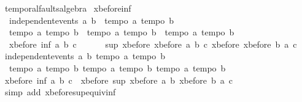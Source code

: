 \begin{isabellebody}
\begin{isamarkuptext}
\end{isamarkuptext}\isamarkuptrue%
\isamarkupfalse%
\ temporal{\isacharunderscore}faults{\isacharunderscore}algebra\isanewline
{}\isanewline
\isanewline
{}\isamarkupfalse%
\ xbefore{\isacharunderscore}inf{\isacharunderscore}{}{\isacharcolon}\ \isanewline
\ \ {\isachardoublequoteopen}independent{\isacharunderscore}events\ a\ b\ {\isasymLongrightarrow}\ {\isasymlbrakk}tempo{}\ a{\isacharsemicolon}\ tempo{}\ b{\isasymrbrakk}\ {\isasymLongrightarrow}\ \isanewline
\ \ {\isasymlbrakk}tempo{}\ a{\isacharsemicolon}\ tempo{}\ b{\isasymrbrakk}\ {\isasymLongrightarrow}\ {\isasymlbrakk}tempo{}\ a{\isacharsemicolon}\ tempo{}\ b{\isasymrbrakk}\ {\isasymLongrightarrow}\ {\isasymlbrakk}tempo{}\ a{\isacharsemicolon}\ tempo{}\ b{\isasymrbrakk}\ {\isasymLongrightarrow}\ \isanewline
\ \ xbefore\ {\isacharparenleft}inf\ a\ b{\isacharparenright}\ c\ {\isacharequal}\ \isanewline
\ \ \ \ sup\ {\isacharparenleft}xbefore\ {\isacharparenleft}xbefore\ a\ b{\isacharparenright}\ c{\isacharparenright}\ {\isacharparenleft}xbefore\ {\isacharparenleft}xbefore\ b\ a{\isacharparenright}\ c{\isacharparenright}{\isachardoublequoteclose}\isanewline
%
\isadelimproof
%
\endisadelimproof
%
\isatagproof
{}\isamarkupfalse%
{\isacharminus}\isanewline
\ \ \isamarkupfalse%
\ {\isachardoublequoteopen}independent{\isacharunderscore}events\ a\ b{\isachardoublequoteclose}\ {\isachardoublequoteopen}tempo{}\ a{\isachardoublequoteclose}\ {\isachardoublequoteopen}tempo{}\ b{\isachardoublequoteclose}\ \isanewline
\ \ {\isachardoublequoteopen}tempo{}\ a{\isachardoublequoteclose}\ {\isachardoublequoteopen}tempo{}\ b{\isachardoublequoteclose}\ {\isachardoublequoteopen}tempo{}\ a{\isachardoublequoteclose}\ {\isachardoublequoteopen}tempo{}\ b{\isachardoublequoteclose}\ {\isachardoublequoteopen}tempo{}\ a{\isachardoublequoteclose}\ {\isachardoublequoteopen}tempo{}\ b{\isachardoublequoteclose}\isanewline
\ \ \isamarkupfalse%
\ {\isachardoublequoteopen}xbefore\ {\isacharparenleft}inf\ a\ b{\isacharparenright}\ c\ {\isacharequal}\ xbefore\ {\isacharparenleft}sup\ {\isacharparenleft}xbefore\ a\ b{\isacharparenright}\ {\isacharparenleft}xbefore\ b\ a{\isacharparenright}{\isacharparenright}\ c{\isachardoublequoteclose}\isanewline
\ \ \ \ \isamarkupfalse%
\ {\isacharparenleft}simp\ add{\isacharcolon}\ xbefore{\isacharunderscore}sup{\isacharunderscore}equiv{\isacharunderscore}inf{\isacharparenright}\isanewline

\end{isabellebody}

